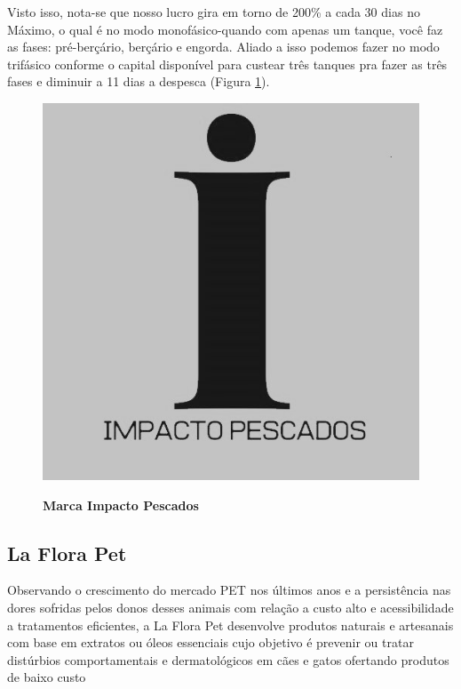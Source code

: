 Visto isso, nota-se que nosso lucro gira em torno de 200\% a cada 30 dias no Máximo, o qual é no modo monofásico-quando com apenas um tanque, você faz as fases: pré-berçário, berçário e engorda. Aliado a isso podemos fazer no modo trifásico conforme o capital disponível para custear três tanques pra fazer as três fases e diminuir a 11 dias a despesca (Figura \ref{figura_23}).

\begin{figure}[H]
\centering
\caption{\textbf{Marca Impacto Pescados}}
\includegraphics[scale=0.4]{Imagens/imacto_pescados.jpg}
\label{figura_23}
\end{figure}


\subsection{La Flora Pet}

Observando o crescimento do mercado PET nos últimos anos e a persistência nas dores sofridas pelos donos desses animais com relação a custo alto e acessibilidade a tratamentos eficientes, a La Flora Pet desenvolve produtos naturais e artesanais com base em extratos ou óleos essenciais cujo objetivo é prevenir ou tratar distúrbios comportamentais e dermatológicos em cães e gatos ofertando produtos de baixo custo

